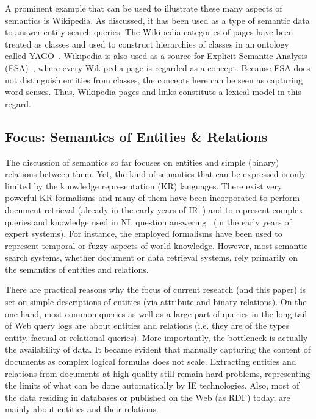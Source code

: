 A prominent example that can be used to illustrate these many aspects of semantics is Wikipedia. As discussed, it has been used as a type of semantic data to answer entity search queries. 
The Wikipedia categories of pages have been treated as classes and used to construct hierarchies of classes in an ontology called YAGO~\cite{DBLP:conf/www/SuchanekKW07}. Wikipedia is also used as a source for Explicit Semantic Analysis (ESA)~\cite{DBLP:journals/tois/EgoziMG11}, where every Wikipedia page is regarded as a concept. Because ESA does not distinguish entities from classes, the concepts here can be seen as capturing word senses. Thus, Wikipedia pages and links constitute a lexical model in this regard. 

\subsection{Focus: Semantics of Entities \& Relations} 

The discussion of semantics so far focuses on entities and simple (binary) relations between them. Yet, the kind of semantics that can be expressed is only limited by the knowledge representation (KR) languages. There exist very powerful KR formalisms and many of them have been incorporated to perform document retrieval (already in the early years of IR~\cite{DBLP:conf/sigir/Rijsbergen89}) and to represent complex queries and knowledge used in NL question answering~\cite{DBLP:journals/tkde/VassiliadisTK94} (in the early years of expert systems). For instance, the employed formalisms have been used to represent temporal or fuzzy aspects of world knowledge. However, most semantic search systems, whether document or data retrieval systems, rely primarily on the semantics of entities and relations. 

There are practical reasons why the focus of current research (and this paper) is set on simple descriptions of entities (via attribute and binary relations). On the one hand, 
most common queries as well as a large part of queries in the long tail of Web query logs 
are about entities and relations (i.e. they are of the types entity, factual or relational queries). More importantly, the bottleneck is actually the availability of data. It became evident that manually capturing the content of documents as complex logical formulas does not scale. Extracting entities and relations from documents at high quality still remain hard problems, representing the limits of what can be done automatically by IE technologies. Also, most of the data residing in databases or published on the Web (as RDF) today, are mainly about entities and their relations. 

